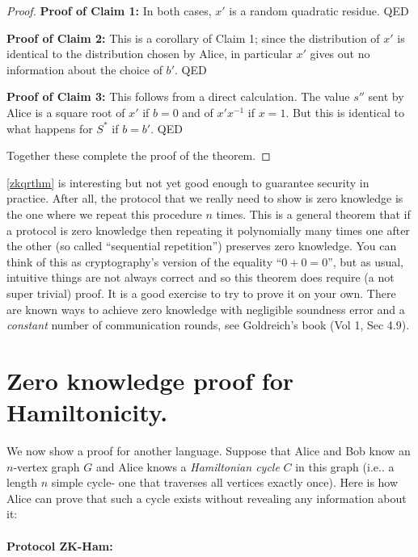 \begin{proof}
\textbf{Proof of Claim 1:} In both cases, \(x'\) is a random quadratic
residue. QED

\textbf{Proof of Claim 2:} This is a corollary of Claim 1; since the
distribution of \(x'\) is identical to the distribution chosen by Alice,
in particular \(x'\) gives out no information about the choice of
\(b'\). QED

\textbf{Proof of Claim 3:} This follows from a direct calculation. The
value \(s''\) sent by Alice is a square root of \(x'\) if \(b=0\) and of
\(x'x^{-1}\) if \(x=1\). But this is identical to what happens for
\(S^*\) if \(b=b'\). QED

Together these complete the proof of the theorem.

\end{proof}

\cref{zkqrthm} is interesting but not yet good enough to guarantee
security in practice. After all, the protocol that we really need to
show is zero knowledge is the one where we repeat this procedure \(n\)
times. This is a general theorem that if a protocol is zero knowledge
then repeating it polynomially many times one after the other (so called
``sequential repetition'') preserves zero knowledge. You can think of
this as cryptography's version of the equality ``\(0+0=0\)'', but as
usual, intuitive things are not always correct and so this theorem does
require (a not super trivial) proof. It is a good exercise to try to
prove it on your own. There are known ways to achieve zero knowledge
with negligible soundness error and a \emph{constant} number of
communication rounds, see Goldreich's book (Vol 1, Sec 4.9).

\section{Zero knowledge proof for
Hamiltonicity.}\label{13-Zero-knowledge-proof-f}

We now show a proof for another language. Suppose that Alice and Bob
know an \(n\)-vertex graph \(G\) and Alice knows a \emph{Hamiltonian
cycle} \(C\) in this graph (i.e.. a length \(n\) simple cycle- one that
traverses all vertices exactly once). Here is how Alice can prove that
such a cycle exists without revealing any information about it:

\paragraph{Protocol ZK-Ham:}

